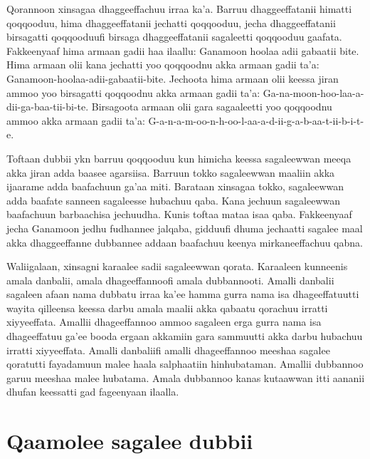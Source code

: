 \documentclass[11pt,b5paper]{book}
\begin{document}
Qorannoon xinsagaa dhaggeeffachuu irraa ka’a. Barruu dhaggeeffatanii himatti qoqqooduu, hima dhaggeeffatanii jechatti qoqqooduu, jecha dhaggeeffatanii birsagatti qoqqooduufi birsaga dhaggeeffatanii sagaleetti qoqqooduu gaafata. Fakkeenyaaf hima armaan gadii haa ilaallu:
Ganamoon hoolaa adii gabaatii bite.
Hima armaan olii kana jechatti yoo qoqqoodnu akka armaan gadii ta’a:
Ganamoon-hoolaa-adii-gabaatii-bite.
Jechoota hima armaan olii keessa jiran ammoo yoo birsagatti
qoqqoodnu akka armaan gadii ta’a:
Ga-na-moon-hoo-laa-a-dii-ga-baa-tii-bi-te.
Birsagoota armaan olii gara sagaaleetti yoo qoqqoodnu ammoo akka armaan gadii ta’a:
G-a-n-a-m-oo-n-h-oo-l-aa-a-d-ii-g-a-b-aa-t-ii-b-i-t-e.

Toftaan dubbii ykn barruu qoqqooduu kun himicha keessa sagaleewwan meeqa akka jiran adda baasee agarsiisa. Barruun tokko sagaleewwan maaliin akka ijaarame adda baafachuun
ga’aa miti. Barataan xinsagaa tokko, sagaleewwan adda baafate sanneen sagaleesse hubachuu qaba. Kana jechuun sagaleewwan baafachuun barbaachisa jechuudha. Kunis toftaa mataa isaa
qaba. Fakkeenyaaf jecha Ganamoon jedhu fudhannee jalqaba, gidduufi dhuma jechaatti sagalee maal akka dhaggeeffanne dubbannee addaan baafachuu keenya mirkaneeffachuu qabna.

Waliigalaan, xinsagni karaalee sadii sagaleewwan qorata. Karaaleen kunneenis amala danbalii, amala dhageeffannoofi amala dubbannooti. Amalli danbalii sagaleen afaan nama dubbatu irraa ka'ee hamma gurra nama isa dhageeffatuutti wayita qilleensa keessa darbu amala maalii akka qabaatu qorachuu irratti xiyyeeffata. Amallii dhageeffannoo ammoo sagaleen erga gurra nama isa
dhageeffatuu ga’ee booda ergaan akkamiin gara sammuutti akka darbu hubachuu irratti xiyyeeffata. Amalli danbaliifi amalli dhageeffannoo meeshaa sagalee qoratutti fayadamuun
malee haala salphaatiin hinhubataman. Amallii dubbannoo garuu meeshaa malee hubatama. Amala dubbannoo kanas kutaawwan itti aananii dhufan keessatti gad fageenyaan ilaalla.

\section{Qaamolee sagalee dubbii}
\end{document}
